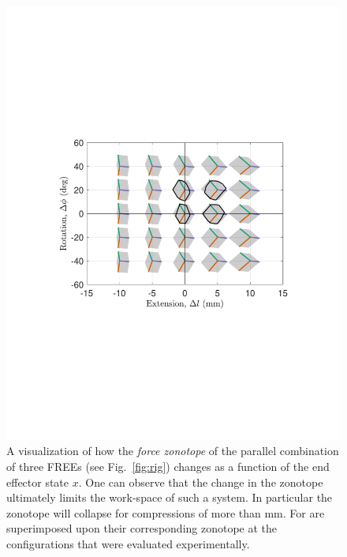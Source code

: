 \begin{figure}
    \centering
    \includegraphics[width=\linewidth]{figures/zntp_vs_x4.pdf}
    \caption{A visualization of how the \emph{force zonotope} of the parallel combination of three FREEs (see Fig.~\ref{fig:rig}) changes as a function of the end effector state $x$. One can observe that the change in the zonotope ultimately limits the work-space of such a system.  In particular the zonotope will collapse for compressions of more than \unit[-10]{mm}.  For  are superimposed upon their corresponding zonotope at the configurations that were evaluated experimentally.}
    \label{fig:zntp_vs_x}
\end{figure}















































